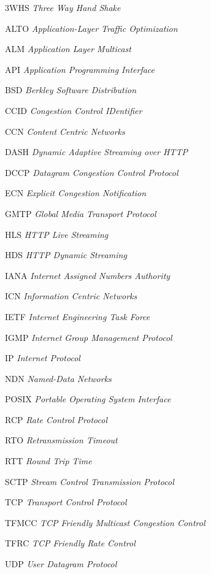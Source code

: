 \begin{siglas}
  \item[3WHS] \textit{Three Way Hand Shake}
  \item[ALTO] \textit{Application-Layer Traffic Optimization}
  \item[ALM] \textit{Application Layer Multicast}
  \item[API] \textit{Application Programming Interface}
  \item[BSD] \textit{Berkley Software Distribution}
  \item[CCID] \textit{Congestion Control IDentifier}
  \item[CCN] \textit{Content Centric Networks}
  \item[DASH] \textit{Dynamic Adaptive Streaming over HTTP}
  \item[DCCP] \textit{Datagram Congestion Control Protocol}
  \item[ECN] \textit{Explicit Congestion Notification}
  \item[GMTP] \textit{Global Media Transport Protocol}
  \item[HLS] \textit{HTTP Live Streaming}
  \item[HDS] \textit{HTTP Dynamic Streaming}
  \item[IANA] \textit{Internet Assigned Numbers Authority}
  \item[ICN] \textit{Information Centric Networks}
  \item[IETF] \textit{Internet Engineering Task Force}
  \item[IGMP] \textit{Internet Group Management Protocol}
  \item[IP] \textit{Internet Protocol}
  \item[NDN] \textit{Named-Data Networks}
  \item[POSIX] \textit{Portable Operating System Interface}
  \item[RCP] \textit{Rate Control Protocol}
  \item[RTO] \textit{Retransmission Timeout}
  \item[RTT] \textit{Round Trip Time}
  \item[SCTP] \textit{Stream Control Transmission Protocol}
  \item[TCP] \textit{Transport Control Protocol}
  \item[TFMCC] \textit{TCP Friendly Multicast Congestion Control}
  \item[TFRC] \textit{TCP Friendly Rate Control}
  \item[UDP] \textit{User Datagram Protocol}
\end{siglas}
